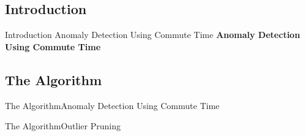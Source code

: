 \subsection{Introduction}
\begin{frame}[label=algorithm-introduction]
        {Introduction}
        {Anomaly Detection Using Commute Time}
    {\LARGE \textbf{Anomaly Detection Using Commute Time}}\\
    \bigskip

\end{frame}

\subsection{The Algorithm}
\begin{frame}[label=algorithm]{The Algorithm}{Anomaly Detection Using Commute Time}\relax
    {\tiny
        \begin{algorithm}[H]
            
        \end{algorithm}
    }
\end{frame}

\begin{frame}[label=algorithm]{The Algorithm}{Outlier Pruning}\relax
    {\tiny
        \begin{algorithm}[H]
            
        \end{algorithm}
    }
\end{frame}

